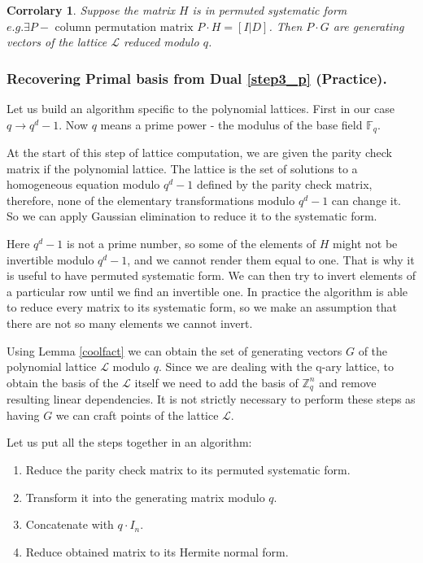 \documentclass[12pt]{article}
\newcommand{\FF}{\mathbb{F}}
\newcommand{\ZZ}{\mathbb{Z}}
\newcommand{\LL}{\mathcal{L}}
\newtheorem{corrolary}{Corrolary}
\begin{document}
\begin{corrolary}
Suppose the matrix $H$ is in permuted systematic form $e.g. \exists P - \text{ column permutation matrix } P \cdot H = [I | D]$. Then $P \cdot G$ are generating vectors of the lattice $\LL$ reduced modulo $q$.
\end{corrolary}
\subsubsection{Recovering Primal basis from Dual \ref{step3_p} (Practice).}
\label{subsubsec:primal_from_dual_pr_polynomials}

Let us build an algorithm specific to the polynomial lattices. First in our case $q \rightarrow q^{d} -1$. Now $q$ means a prime power - the modulus of the base field $\FF_{q}$.

At the start of this step of lattice computation, we are given the parity check matrix if the polynomial lattice. The lattice is the set of solutions to a homogeneous equation modulo $q^{d} -1$ defined by the parity check matrix, therefore, none of the elementary transformations modulo $q^{d} -1$ can change it. So we can apply Gaussian elimination to reduce it to the systematic form.

Here $q^{d} -1$ is not a prime number, so some of the elements of $H$ might not be invertible modulo $q^{d} -1$, and we cannot render them equal to one. That is why it is useful to have permuted systematic form. We can then try to invert elements of a particular row until we find an invertible one. In practice the algorithm is able to reduce every matrix to its systematic form, so we make an assumption that there are not so many elements we cannot invert.

Using Lemma \ref{coolfact} we can obtain the set of generating vectors $G$ of the polynomial lattice $\LL$ modulo $q$. Since we are dealing with the q-ary lattice, to obtain the basis of the $\LL$ itself we need to add the basis of $\ZZ^{n}_{q}$ and remove resulting linear dependencies. It is not strictly necessary to perform these steps as having $G$ we can craft points of the lattice $\LL$.

Let us put all the steps together in an algorithm:
\begin{enumerate}
    \item Reduce the parity check matrix to its permuted systematic form.
    \item Transform it into the generating matrix modulo $q$.
    \item Concatenate with $q \cdot I_{n}$.
    \item Reduce obtained matrix to its Hermite normal form.
\end{enumerate}
\end{document}
